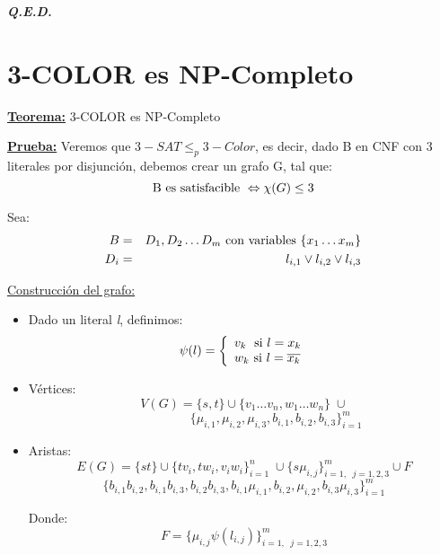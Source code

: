 \documentclass[12pt,a4paper]{report}
\newcommand{\QED}{\hfill \textit{\textbf{Q.E.D.}}}
\begin{document}
		\QED

	\section{3-COLOR es NP-Completo}
		\textbf{\underline{Teorema:}} 3-COLOR es NP-Completo

		\textbf{\underline{Prueba:}} Veremos que $3-SAT \leq_{p} 3-Color$, es decir, dado B en CNF con 3 literales por disjunción, debemos crear un grafo G, tal que:
			\[ \textup{B es satisfacible } \Leftrightarrow \chi(G) \leq 3 \]
			\par Sea:
				\begin{eqnarray}
					\nonumber B &=& D_{1}, D_{2} \dotsc D_{m} \textup{ con variables } \lbrace x_{1} \dotsc x_{m} \rbrace \\
					\nonumber D_{i} &=& l_{i, 1} \vee l_{i, 2} \vee l_{i, 3}
				\end{eqnarray}

			\vspace{3mm}
			\underline{Construcción del grafo:}
				\begin{itemize}
					\item Dado un literal \textit{l}, definimos:
						\begin{equation*}
							\psi(l) =
	  					\left \lbrace
			  			\begin{array}{l}
	    				 	v_{k} \; \textup{ si } l = x_{k} \\
	    		 			w_{k} \textup{ si } l = \overline{x_{k}}
			  			\end{array}
	  					\right.
						\end{equation*}
					\item Vértices:
						\[ V(G) = \lbrace s, t \rbrace \cup \lbrace v_{1} \dotsc v_{n}, w_{1} \dotsc w_{n} \rbrace \; \cup \]
						\[ \qquad \qquad \; \; \; \; \lbrace \mu_{i, 1}, \mu_{i, 2}, \mu_{i, 3}, b_{i, 1}, b_{i, 2}, b_{i, 3} \rbrace_{i = 1}^{m}  \]
					\item Aristas:
						\[ E(G) = \lbrace s t \rbrace \cup \lbrace t v_{i}, t w_{i}, v_{i} w_{i} \rbrace_{i = 1}^{n} \; \cup \lbrace s \mu_{i, j} \rbrace_{i = 1, \; \; j = 1, 2, 3}^{m} \cup F \]
						\[ \lbrace b_{i, 1} b_{i, 2}, b_{i, 1} b_{i, 3}, b_{i, 2} b_{i, 3}, b_{i, 1} \mu_{i, 1}, b_{i, 2}, \mu_{i, 2}, b_{i, 3} \mu_{i, 3} \rbrace_{i = 1}^{m}\]
						\par Donde:
						\[ F = \lbrace \mu_{i, j} \psi(l_{i, j}) \rbrace_{i = 1, \; \; j = 1, 2, 3}^{m}\]
				\end{itemize}
\end{document}
